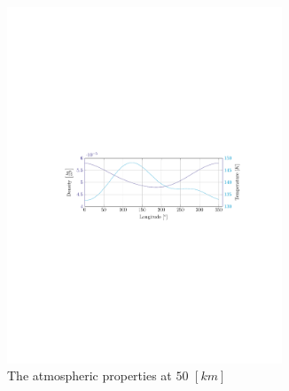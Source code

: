 \begin{figure}[h]
	\centering
	\begin{subfigure}{0.9\textwidth}
	\centering
	\includegraphics[trim={4.25cm 11cm 3.2cm 11cm},clip,width=0.9\textwidth]{Figure/atmos_model/lon_50.pdf}
	\caption{The atmospheric properties at $50$ $\left[km\right]$} 
	\label{fig:atmos_lon_50}
	\end{subfigure}
	\begin{subfigure}{0.9\textwidth}
	\centering

\end{subfigure}
\end{figure}
